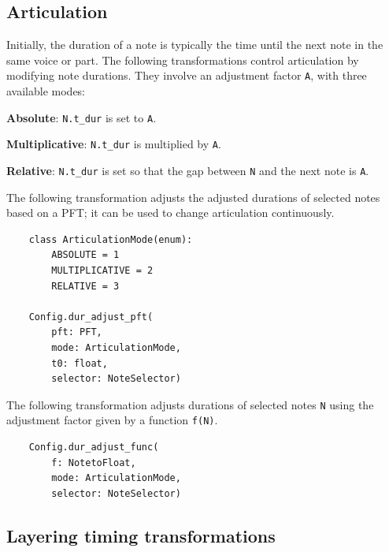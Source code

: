 \documentclass[letterpaper, 12pt]{article}
\begin{document}
\subsection{Articulation}

Initially, the duration of a note is typically the time until
the next note in the same voice or part.
The following transformations control articulation by modifying note durations.
They involve an adjustment factor \texttt{A},
with three available modes:

\textbf{Absolute}: \texttt{N.t\_dur} is set to \texttt{A}.

\textbf{Multiplicative}: \texttt{N.t\_dur} is multiplied by \texttt{A}.

\textbf{Relative}: \texttt{N.t\_dur} is set so that the gap between \texttt{N}
and the next note is \texttt{A}.

The following transformation adjusts the adjusted durations of selected notes
based on a PFT;
it can be used to change articulation continuously.
\begin{small}\begin{singlespace}\vspace{-18px}\begin{verbatim}
    class ArticulationMode(enum):
        ABSOLUTE = 1
        MULTIPLICATIVE = 2
        RELATIVE = 3

    Config.dur_adjust_pft(
        pft: PFT,
        mode: ArticulationMode,
        t0: float,
        selector: NoteSelector)
\end{verbatim}\end{singlespace}\end{small}\vspace{-18px}\noindent

The following transformation adjusts durations
of selected notes \texttt{N} using the adjustment factor
given by a function \texttt{f(N)}.
\begin{small}\begin{singlespace}\vspace{-18px}\begin{verbatim}
    Config.dur_adjust_func(
        f: NotetoFloat,
        mode: ArticulationMode,
        selector: NoteSelector)
\end{verbatim}\end{singlespace}\end{small}\vspace{-18px}\noindent

\subsection{Layering timing transformations}
\end{document}
